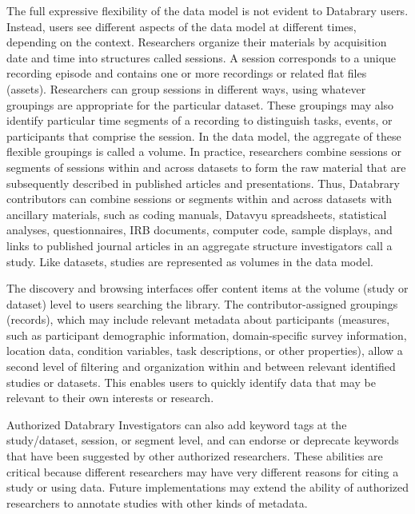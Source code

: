 \documentclass[letterpaper,man,apacite]{apa6}
\begin{document}
The full expressive flexibility of the data model is not evident to Databrary users. 
Instead, users see different aspects of the data model at different times, depending on the context. Researchers organize their materials by acquisition date and time into structures called sessions.
A session corresponds to a unique recording episode and contains one or more recordings or related flat files (assets). Researchers can group sessions in different ways, using whatever groupings are appropriate for
the particular dataset. 
These groupings may also identify particular time segments of a recording to distinguish tasks, events, or
participants that comprise the session. 
In the data model, the aggregate of these flexible groupings is called a volume. 
In practice, researchers combine sessions or segments of sessions within and across datasets to
form the raw material that are subsequently described in published
articles and presentations. 
Thus, Databrary contributors can combine sessions or segments within and across datasets with ancillary
materials, such as coding manuals, Datavyu spreadsheets, statistical analyses, questionnaires, IRB documents, computer code, sample displays, and links to published journal articles in an aggregate structure
investigators call a study. 
Like datasets, studies are represented as volumes in the data model.

The discovery and browsing interfaces offer content items at the volume (study or dataset) level to users searching the library. The contributor-assigned groupings (records), which may include relevant
metadata about participants (measures, such as participant demographic information, domain-specific survey information, location data, condition variables, task descriptions, or other properties), allow a
second level of filtering and organization within and between relevant
identified studies or datasets.
This enables users to quickly identify data that may be relevant to their own interests or research.

Authorized Databrary Investigators can also add keyword tags at the study/dataset, session, or segment level, and can endorse or deprecate keywords that have been suggested by other authorized researchers. These
abilities are critical because different researchers may have very different reasons for citing a study or using data. Future implementations may extend the ability of authorized researchers to
annotate studies with other kinds of metadata.
\end{document}

